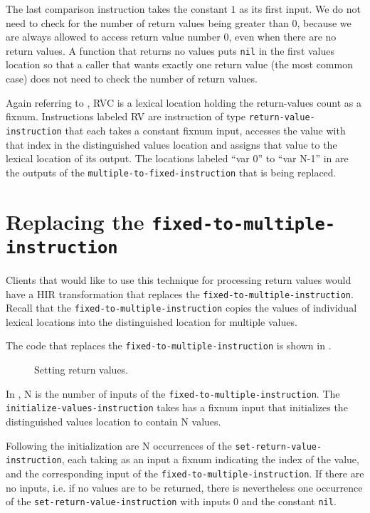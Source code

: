 The last comparison instruction takes the constant $1$ as its first
input.  We do not need to check for the number of return values being
greater than $0$, because we are always allowed to access return value
number $0$, even when there are no return values.  A function that
returns no values puts \texttt{nil} in the first values location so
that a caller that wants exactly one return value (the most common
case) does not need to check the number of return values.

Again referring to , RVC is a lexical
location holding the return-values count as a fixnum.  Instructions
labeled RV are instruction of type \texttt{return-value-instruction}
that each takes a constant fixnum input, accesses the value with that
index in the distinguished values location and assigns that value to
the lexical location of its output.  The locations labeled ``var 0''
to ``var N-1'' in  are the outputs of the
\texttt{multiple-to-fixed-instruction} that is being replaced.

\section{Replacing the \texttt{fixed-to-multiple-instruction}}

Clients that would like to use this technique for processing return
values would have a HIR transformation that replaces the
\texttt{fixed-to-multiple-instruction}.  Recall that the
\texttt{fixed-to-multiple-instruction} copies the values of individual
lexical locations into the distinguished location for multiple values.

The code that replaces the \texttt{fixed-to-multiple-instruction} is
shown in .

\begin{figure}
\begin{center}
\end{center}
\caption{\label{fig-set-values}
Setting return values.}
\end{figure}

In , N is the number of inputs of the
\texttt{fixed-to-multiple-instruction}.  The
\texttt{initialize-values-instruction} takes has a fixnum input that
initializes the distinguished values location to contain N values.

Following the initialization are N occurrences of the
\texttt{set-return-value-instruction}, each taking as an input a
fixnum indicating the index of the value, and the corresponding input
of the \texttt{fixed-to-multiple-instruction}.  If there are no
inputs, i.e. if no values are to be returned, there is nevertheless
one occurrence of the \texttt{set-return-value-instruction} with
inputs 0 and the constant \texttt{nil}.
